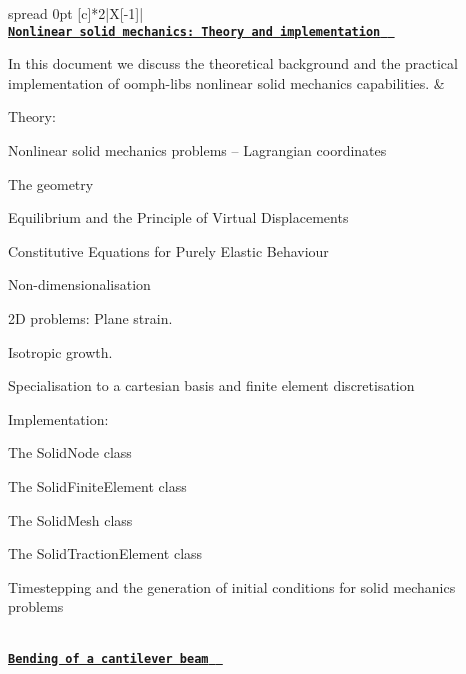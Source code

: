 \tabulinesep=1mm
\begin{longtabu} spread 0pt [c]{*{2}{|X[-1]}|}
\hline
{}\\
\href{../../solid/solid_theory/html/index.html}{\tt {\bfseries Nonlinear solid mechanics\+: Theory and implementation } }

In this document we discuss the theoretical background and the practical implementation of {\ttfamily oomph-\/lib\textquotesingle{}s} nonlinear solid mechanics capabilities.  &
\begin{DoxyItemize}
\item Theory\+:
\begin{DoxyItemize}
\item Nonlinear solid mechanics problems -- Lagrangian coordinates
\item The geometry
\item Equilibrium and the Principle of Virtual Displacements
\item Constitutive Equations for Purely Elastic Behaviour
\item Non-\/dimensionalisation
\item 2D problems\+: Plane strain.
\item Isotropic growth.
\item Specialisation to a cartesian basis and finite element discretisation
\end{DoxyItemize}
\item Implementation\+:
\begin{DoxyItemize}
\item The {\ttfamily Solid\+Node} class
\item The {\ttfamily Solid\+Finite\+Element} class
\item The {\ttfamily Solid\+Mesh} class
\item The {\ttfamily Solid\+Traction\+Element} class
\end{DoxyItemize}
\item Timestepping and the generation of initial conditions for solid mechanics problems
\end{DoxyItemize}

\\
\href{../../solid/airy_cantilever/html/index.html}{\tt {\bfseries Bending of a cantilever beam } }


\end{longtabu}
